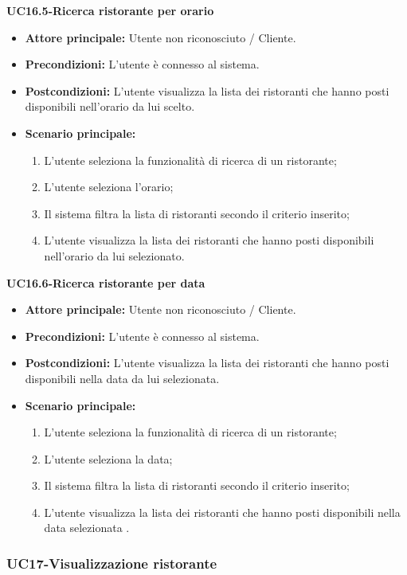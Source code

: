 \textbf{UC16.5-Ricerca ristorante per orario}
\begin{itemize}
\item \textbf{Attore principale: }Utente non riconosciuto / Cliente.
\item \textbf{Precondizioni:} L'utente è connesso al sistema.
\item \textbf{Postcondizioni:} L'utente visualizza la lista dei ristoranti che hanno posti disponibili nell'orario
da lui scelto.
\item \textbf{Scenario principale:}
\begin{enumerate}
    \item L'utente seleziona la funzionalità di ricerca di un ristorante;
    \item L'utente seleziona l'orario;
    \item Il sistema filtra la lista di ristoranti secondo il criterio inserito;
    \item L'utente visualizza la lista dei ristoranti che hanno posti disponibili nell'orario da lui
    selezionato.
\end{enumerate}
\end{itemize}

\textbf{UC16.6-Ricerca ristorante per data}
\begin{itemize}
\item \textbf{Attore principale:} Utente non riconosciuto / Cliente.
\item \textbf{Precondizioni:} L'utente è connesso al sistema.
\item \textbf{Postcondizioni:} L'utente visualizza la lista dei ristoranti che hanno posti disponibili
nella data da lui selezionata.
\item \textbf{Scenario principale:}
\begin{enumerate}
    \item L'utente seleziona la funzionalità di ricerca di un ristorante;
    \item L'utente seleziona la data;
    \item Il sistema filtra la lista di ristoranti secondo il criterio inserito;
    \item L'utente visualizza la lista dei ristoranti che hanno posti disponibili
    nella data selezionata .
\end{enumerate}
\end{itemize}

\pagebreak
\subsubsection{UC17-Visualizzazione ristorante} 

